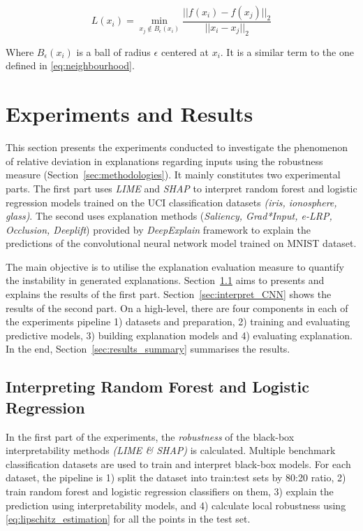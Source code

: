 \documentclass[english]{tktltiki2}
\theoremstyle{definition}
\theoremstyle{remark}
\begin{document}
\begin{equation}\label{eq:lipschitz_estimation_as_a_separability_measure}
L(x_i) = \min_{x_j \notin B_{\epsilon}(x_i)}  \frac{||f(x_i) - f(x_j)||_{2}}{||x_i - x_j||_{2}}
\end{equation}

Where $B_{\epsilon}(x_{i})$ is a ball of radius $\epsilon$ centered at $x_i$. It is a similar term to the one defined in \eqref{eq:neighbourhood}. 


\section{Experiments and Results}\label{sec:experiments} %
This section presents the experiments conducted to investigate the phenomenon of relative deviation in explanations regarding inputs using the robustness measure (Section~\ref{sec:methodologies}). It mainly constitutes two experimental parts. The first part uses \textit{LIME} and \textit{SHAP} to interpret random forest and logistic regression models trained on the UCI classification datasets \textit{(iris, ionosphere, glass)}. The second uses explanation methods (\textit{Saliency, Grad*Input, e-LRP, Occlusion, Deeplift}) provided by \textit{DeepExplain} framework to explain the predictions of the convolutional neural network model trained on MNIST dataset.

The main objective is to utilise the explanation evaluation measure to quantify the instability in generated explanations. Section~\ref{sec:interpret_RN_LR} aims to presents and explains the results of the first part. Section~\ref{sec:interpret_CNN} shows the results of the second part.  On a high-level, there are four components in each of the experiments pipeline 1) datasets and preparation, 2) training and evaluating predictive models, 3) building explanation models and 4) evaluating explanation. In the end, Section~\ref{sec:results_summary} summarises the results.

\subsection{Interpreting Random Forest and Logistic Regression}\label{sec:interpret_RN_LR}
In the first part of the experiments, the \textit{robustness} of the black-box interpretability methods \textit{(LIME \& SHAP)} is calculated. Multiple benchmark classification datasets are used to train and interpret black-box models. For each dataset, the pipeline is 1) split the dataset into train:test sets by 80:20 ratio, 2) train random forest and logistic regression classifiers on them, 3) explain the prediction using interpretability models, and 4) calculate local robustness using \eqref{eq:lipschitz_estimation} for all the points in the test set.
\end{document}
